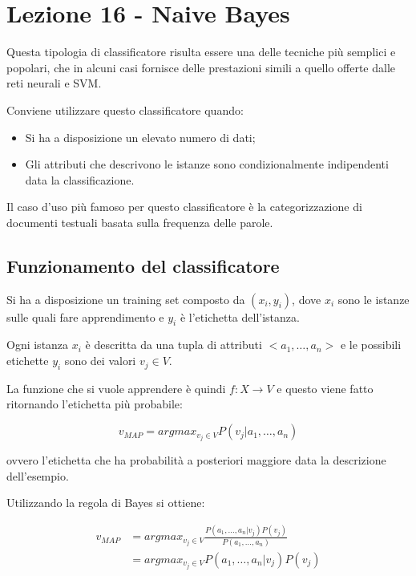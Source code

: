
\section{Lezione 16 - Naive Bayes}

Questa tipologia di classificatore risulta essere una delle tecniche più semplici e popolari, che in alcuni casi fornisce delle prestazioni simili a quello offerte dalle reti neurali e SVM.

Conviene utilizzare questo classificatore quando:

\begin{itemize}
	\item Si ha a disposizione un elevato numero di dati;
	\item Gli attributi che descrivono le istanze sono condizionalmente indipendenti data la classificazione.
\end{itemize}

Il caso d'uso più famoso per questo classificatore è la categorizzazione di documenti testuali basata sulla frequenza delle parole.

\subsection{Funzionamento del classificatore}

Si ha a disposizione un training set composto da $(x_i, y_i)$, dove $x_i$ sono le istanze sulle quali fare apprendimento e $y_i$ è l'etichetta dell'istanza.

Ogni istanza $x_i$ è descritta da una tupla di attributi $<a_1, \ldots, a_n>$ e le possibili etichette $y_i$ sono dei valori $v_j \in V$.

La funzione che si vuole apprendere è quindi $f :  X \rightarrow V $ e questo viene fatto ritornando l'etichetta più probabile:

$$
v_{MAP} = argmax_{v_j \in V} P(v_j | a_1 , \ldots, a_n)
$$ 

ovvero l'etichetta che ha probabilità a posteriori maggiore data la descrizione dell'esempio.

Utilizzando la regola di Bayes si ottiene:

\begin{align*}
v_{MAP}  &= argmax_{v_j \in V}\frac{ P( a_1 , \ldots, a_n | v_j)P(v_j)}{P( a_1 , \ldots, a_n)} \\
				&= argmax_{v_j \in V} P( a_1 , \ldots, a_n | v_j)P(v_j)
\end{align*}

